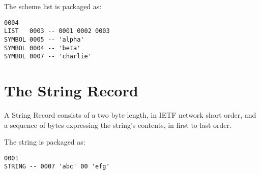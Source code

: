 \documentclass[notitlepage,oneside]{book}
\begin{document}
The scheme list  is packaged as:

\begin{verbatim}
0004 
LIST   0003 -- 0001 0002 0003
SYMBOL 0005 -- 'alpha'
SYMBOL 0004 -- 'beta'
SYMBOL 0007 -- 'charlie'
\end{verbatim}

\section{The String Record}
\label{string-record}

A String Record consists of a two byte length, in IETF network short order, and a sequence of bytes expressing the string's contents, in first to last order.  

The string  is packaged as:

\begin{verbatim}
0001
STRING -- 0007 'abc' 00 'efg'
\end{verbatim}

\printindex
\end{document}
